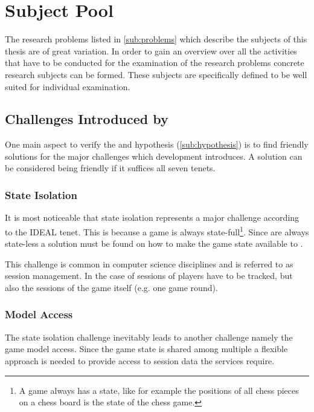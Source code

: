 \section{Subject Pool}
\label{sec:subject_pool}

The research problems listed in \autoref{sub:problems} which describe the
subjects of this thesis are of great variation. In order to gain an overview
over all the activities that have to be conducted for the examination of the
research problems concrete research subjects can be formed. These subjects are
specifically defined to be well suited for individual examination.

\subsection{Challenges Introduced by \mssuc{}}
\label{sub:ms_challenges}

One main aspect to verify the \ogs{} and \mss{} hypothesis
(\autoref{sub:hypothesis}) is to find \ms{} friendly solutions for the major
challenges which \og{} development introduces. A solution can be considered
being \ms{} friendly if it suffices all seven \ms{} tenets.

\subsubsection{State Isolation}

It is most noticeable that \ms{} state isolation represents a major challenge
according to the IDEAL tenet. This is because a game is always
state-full\footnote{A game always has a state, like for example the positions of
all chess pieces on a chess board is the state of the chess game.}. Since \mss{}
are always state-less a solution must be found on how to make the game state
available to \mss{}.

This challenge is common in computer science disciplines and is referred to as
session management. In the case of \ogs{} sessions of players have to be
tracked, but also the sessions of the game itself (e.g. one game round).

\subsubsection{Model Access}

The state isolation challenge inevitably leads to another challenge namely the
game model access. Since the game state is shared among multiple \mss{} a
flexible approach is needed to provide access to session data the services
require.

